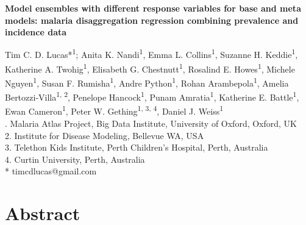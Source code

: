 \documentclass[11pt]{article}
\begin{document}



\small{

\begin{center}
\textbf{Model ensembles with different response variables for base and meta models: malaria disaggregation regression combining prevalence and incidence data}
\end{center}



{
\noindent Tim C. D. Lucas*\textsuperscript{1}; 
Anita K. Nandi\textsuperscript{1},
Emma L. Collins\textsuperscript{1},
Suzanne H. Keddie\textsuperscript{1},
Katherine A. Twohig\textsuperscript{1},
Elisabeth G. Chestnutt\textsuperscript{1},
Rosalind E. Howes\textsuperscript{1},
Michele Nguyen\textsuperscript{1},
Susan F. Rumisha\textsuperscript{1},
Andre Python\textsuperscript{1},
Rohan Arambepola\textsuperscript{1},
Amelia Bertozzi-Villa\textsuperscript{1, 2},
Penelope Hancock\textsuperscript{1},
Punam Amratia\textsuperscript{1},
Katherine E. Battle\textsuperscript{1},
Ewan Cameron\textsuperscript{1},
Peter W. Gething\textsuperscript{1, 3, 4},
Daniel J. Weiss\textsuperscript{1}}\vspace{0.4cm}\\

{
. Malaria Atlas Project, Big Data Institute, University of Oxford, Oxford, UK \\
2. Institute for Disease Modeling, Bellevue WA, USA\\
3. Telethon Kids Institute, Perth Children’s Hospital, Perth, Australia\\
4. Curtin University, Perth, Australia\\
* timcdlucas@gmail.com}\\ 


\section{Abstract}




}
\end{document}
